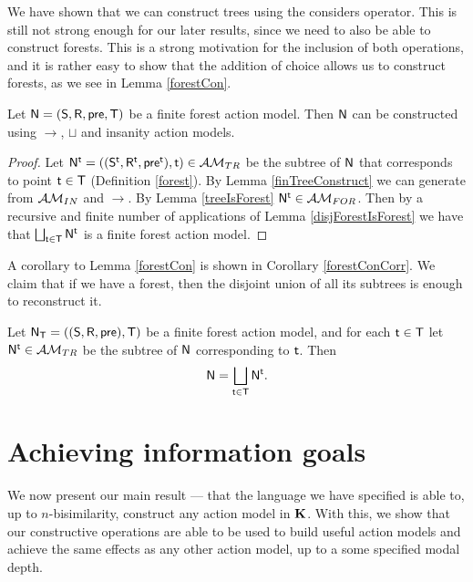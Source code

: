 We have shown that we can construct trees using the considers operator.
This is still not strong enough for our later results, since we need to also be able to construct
forests.
This is a strong motivation for the inclusion of both operations, and it is rather easy to show that
the addition of choice allows us to construct forests, as we see in Lemma \ref{forestCon}.

\begin{lemma} \label{forestCon}
Let $\mathrm{\mathsf{N}} = (\mathrm{\mathsf{S}}, \mathrm{\mathsf{R}}, \mathrm{\mathsf{pre}}, \mathrm{\mathsf{T}})$ be a finite forest action model.
Then $\mathrm{\mathsf{N}}$ can be constructed using $\to$, $\sqcup$ and insanity action models.
\end{lemma}

\begin{proof}
	Let $\mathrm{\mathsf{N}}^\mathrm{\mathsf{t}} = ((\mathrm{\mathsf{S}}^\mathrm{\mathsf{t}}, \mathrm{\mathsf{R}}^\mathrm{\mathsf{t}}, \mathrm{\mathsf{pre}}^\mathrm{\mathsf{t}}), \mathrm{\mathsf{t}}) \in \mathcal{AM}_{TR}$ be the
subtree of $\mathrm{\mathsf{N}}$ that corresponds to point $\mathrm{\mathsf{t}} \in \mathrm{\mathsf{T}}$ (Definition \ref{forest}).
By Lemma \ref{finTreeConstruct} we can generate from $\mathcal{AM}_{IN}$ and $\to$.
By Lemma \ref{treeIsForest} $\mathrm{\mathsf{N}}^\mathrm{\mathsf{t}} \in \mathcal{AM}_{FOR}$.
Then by a recursive and finite number of applications of Lemma
\ref{disjForestIsForest} we have that $\bigsqcup_{\mathrm{\mathsf{t}} \in \mathrm{\mathsf{T}}} \mathrm{\mathsf{N}}^\mathrm{\mathsf{t}}$ is a finite
forest action model.
\end{proof}

A corollary to Lemma \ref{forestCon} is shown in Corollary \ref{forestConCorr}.
We claim that if we have a forest, then the disjoint union of all its subtrees is enough to
reconstruct it.

\begin{corr} \label{forestConCorr}
Let $\mathrm{\mathsf{N}}_\mathrm{\mathsf{T}} = ((\mathrm{\mathsf{S}}, \mathrm{\mathsf{R}}, \mathrm{\mathsf{pre}}), \mathrm{\mathsf{T}})$ be a finite forest action model, and for each $\mathrm{\mathsf{t}} \in \mathrm{\mathsf{T}}$ let $\mathrm{\mathsf{N}}^\mathrm{\mathsf{t}} \in
\mathcal{AM}_{TR}$ be the subtree of $\mathrm{\mathsf{N}}$ corresponding to $\mathrm{\mathsf{t}}$.
Then
\[
	\mathrm{\mathsf{N}} = \bigsqcup_{\mathrm{\mathsf{t}} \in \mathrm{\mathsf{T}}} \mathrm{\mathsf{N}}^\mathrm{\mathsf{t}}.
\]
\end{corr}

\section{Achieving information goals} \label{subsec:multi:achievingGoals}

We now present our main result --- that the language we have specified is able to, up to
$n$-bisimilarity, construct any action model in $\bf K$.
With this, we show that our constructive operations are able to be used to build useful action models
and achieve the same effects as any other action model, up to a some specified modal depth.

